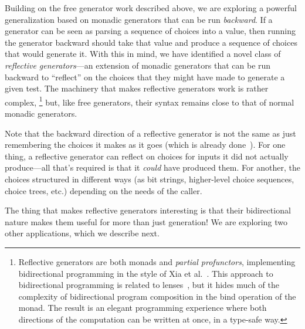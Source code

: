 Building on the free generator work described above, we are exploring
a powerful generalization based on
monadic generators that can be run {\em backward}.
%
If a generator can be seen as parsing a sequence of choices into a
value, then running the
generator backward should take that value and produce a sequence of choices that
would generate it.  With this in mind, we have identified a
novel class of {\em reflective
generators}---an extension of monadic generators that can be run backward to
``reflect'' on the choices that they might have made to generate a
given test. The machinery
that makes reflective generators work is rather complex,%
\footnote{Reflective generators are both monads and {\em
    partial profunctors},
implementing bidirectional programming in the style of Xia et
al.~\cite{xia2019composing}. This approach to bidirectional programming is
related to lenses~\cite{foster2009bidirectional}, but it hides much of the
complexity of bidirectional program composition in the bind operation of the
monad. The result is an elegant programming experience where both directions of
the computation can be written at once, in a type-safe way.}
but, like free generators, their syntax remains close to that of normal
monadic generators.

Note that the backward direction of a reflective generator is not the
same as just remembering the choices it makes as it goes (which is
already done~\cite{maciver2019hypothesis,
  hatfield-dodds_hypofuzz_nodate}). For one thing, a reflective
generator can reflect on choices for inputs it did not actually
produce---all that's required is that it {\em could} have produced
them.  For another, the choices structured in different ways (as bit
strings, higher-level choice sequences, choice trees, etc.) depending
on the needs of the caller.

The thing that makes reflective generators interesting is that their
bidirectional nature makes them useful for more than just generation!
We are exploring two other applications, which we describe
next.

\medskip

